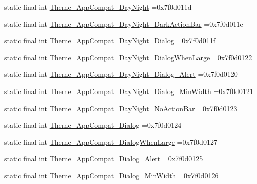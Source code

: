 \begin{DoxyCompactItemize}
\item 
static final int \mbox{\hyperlink{classbr_1_1unb_1_1cic_1_1mp_1_1marketmaster_1_1R_1_1style_ad5df5271f92e47de3e197bd61c3ebae1}{Theme\+\_\+\+App\+Compat\+\_\+\+Day\+Night}} =0x7f0d011d
\item 
static final int \mbox{\hyperlink{classbr_1_1unb_1_1cic_1_1mp_1_1marketmaster_1_1R_1_1style_ab5f90cb8634153ffd3f96f5a894d5f18}{Theme\+\_\+\+App\+Compat\+\_\+\+Day\+Night\+\_\+\+Dark\+Action\+Bar}} =0x7f0d011e
\item 
static final int \mbox{\hyperlink{classbr_1_1unb_1_1cic_1_1mp_1_1marketmaster_1_1R_1_1style_ae7564c8b7826fff75eb4ba211c600d73}{Theme\+\_\+\+App\+Compat\+\_\+\+Day\+Night\+\_\+\+Dialog}} =0x7f0d011f
\item 
static final int \mbox{\hyperlink{classbr_1_1unb_1_1cic_1_1mp_1_1marketmaster_1_1R_1_1style_a14f332e29275c3075a3a9d0cf3cecf2f}{Theme\+\_\+\+App\+Compat\+\_\+\+Day\+Night\+\_\+\+Dialog\+When\+Large}} =0x7f0d0122
\item 
static final int \mbox{\hyperlink{classbr_1_1unb_1_1cic_1_1mp_1_1marketmaster_1_1R_1_1style_ad0d329ea8352fd29b992a9b27e6d907e}{Theme\+\_\+\+App\+Compat\+\_\+\+Day\+Night\+\_\+\+Dialog\+\_\+\+Alert}} =0x7f0d0120
\item 
static final int \mbox{\hyperlink{classbr_1_1unb_1_1cic_1_1mp_1_1marketmaster_1_1R_1_1style_adbccac48bac68f454d52c0deb7a5a944}{Theme\+\_\+\+App\+Compat\+\_\+\+Day\+Night\+\_\+\+Dialog\+\_\+\+Min\+Width}} =0x7f0d0121
\item 
static final int \mbox{\hyperlink{classbr_1_1unb_1_1cic_1_1mp_1_1marketmaster_1_1R_1_1style_aef282e561de6834167bb7f158e81de97}{Theme\+\_\+\+App\+Compat\+\_\+\+Day\+Night\+\_\+\+No\+Action\+Bar}} =0x7f0d0123
\item 
static final int \mbox{\hyperlink{classbr_1_1unb_1_1cic_1_1mp_1_1marketmaster_1_1R_1_1style_a6f3bea8d9450a371b33bb5cfeeb73a70}{Theme\+\_\+\+App\+Compat\+\_\+\+Dialog}} =0x7f0d0124
\item 
static final int \mbox{\hyperlink{classbr_1_1unb_1_1cic_1_1mp_1_1marketmaster_1_1R_1_1style_a663125f384bb1f713ee19efc824b5e8a}{Theme\+\_\+\+App\+Compat\+\_\+\+Dialog\+When\+Large}} =0x7f0d0127
\item 
static final int \mbox{\hyperlink{classbr_1_1unb_1_1cic_1_1mp_1_1marketmaster_1_1R_1_1style_aa215a2bf74b4287279ab88579bbd287f}{Theme\+\_\+\+App\+Compat\+\_\+\+Dialog\+\_\+\+Alert}} =0x7f0d0125
\item 
static final int \mbox{\hyperlink{classbr_1_1unb_1_1cic_1_1mp_1_1marketmaster_1_1R_1_1style_a1c50b3ad46180a866fe810a134a60702}{Theme\+\_\+\+App\+Compat\+\_\+\+Dialog\+\_\+\+Min\+Width}} =0x7f0d0126

\end{DoxyCompactItemize}
